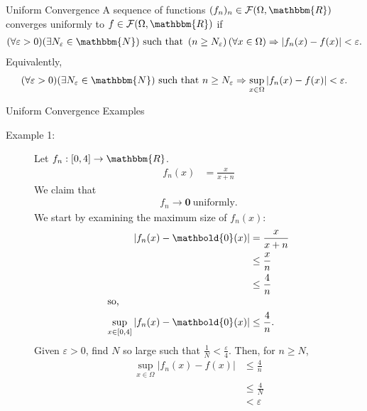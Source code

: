 \documentclass[10pt]{extarticle}
\renewcommand{\mathbf}[1]{\mathbold{#1}}
\newcommand{\N}{\mathbbm{N}}
\newcommand{\R}{\mathbbm{R}}
\begin{document}
  \begin{problem}{Uniform Convergence}
    A sequence of functions $(f_n)_n\in \mathcal{F}(\Omega,\R)$ converges uniformly to $f\in \mathcal{F}(\Omega,\R)$ if
    \begin{align*}
      (\forall \varepsilon > 0)(\exists N_{\varepsilon}\in\N) \text{ such that } \left(n \geq N_{\varepsilon}\right)  (\forall x \in \Omega)\Rightarrow \left|f_n(x) - f(x)\right| < \varepsilon.
    \end{align*}
    Equivalently,
    \begin{align*}
      (\forall \varepsilon > 0)(\exists N_{\varepsilon}\in \N) \text{ such that } n\geq N_{\varepsilon} \Rightarrow \sup_{x\in\Omega}\left|f_n(x) - f(x)\right| < \varepsilon.
    \end{align*}
  \end{problem}
  \begin{problem}{Uniform Convergence Examples}
    \begin{description}
      \item[Example 1:] Let $f_n: [0,4] \rightarrow \R$.
        \begin{align*}
          f_n(x) &= \frac{x}{x+n}
        \end{align*}
        We claim that
        \begin{align*}
          f_n \rightarrow \mathbf{0}~\text{uniformly}.
        \end{align*}
        We start by examining the maximum size of $f_n(x)$:
        \begin{align*}
          \left|f_n(x) - \mathbf{0}(x)\right| &= \frac{x}{x+n}\\
                                              &\leq \frac{x}{n}\\
                                              &\leq \frac{4}{n}\\
                                              \shortintertext{so,}
          \sup_{x\in[0,4]}\left|f_n(x)-\mathbf{0}(x)\right|&\leq \frac{4}{n}.
        \end{align*}
        Given $\varepsilon > 0$, find $N$ so large such that $\frac{1}{N} < \frac{\varepsilon}{4}$. Then, for $n \geq N$,
        \begin{align*}
          \sup_{x\in\Omega}\left|f_n(x) - f(x) \right| &\leq \frac{4}{n}\\
                                                       &\leq \frac{4}{N}\\
                                                       &< \varepsilon
        \end{align*}
    \end{description}
  \end{problem}
\end{document}
